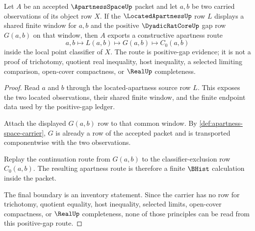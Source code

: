 \begin{theorem}
\label{thm:apartness-space-located-positive-gap}
Let $A$ be an accepted $\ApartnessSpaceUp$ packet and let $a,b$ be two carried
observations of its object row $X$. If the $\LocatedApartnessUp$ row $L$
displays a shared finite window for $a,b$ and the positive $\DyadicRatCoreUp$
gap row $G(a,b)$ on that window, then $A$ exports a constructive apartness
route
$$
a,b\longmapsto L(a,b)\longmapsto G(a,b)\longmapsto C_0(a,b)
$$
inside the local point classifier of $X$. The route is positive-gap evidence;
it is not a proof of trichotomy, quotient real inequality, host inequality, a
selected limiting comparison, open-cover compactness, or $\RealUp$
completeness.
\end{theorem}
\begin{proof}
Read $a$ and $b$ through the located-apartness source row $L$. This exposes the
two located observations, their shared finite window, and the finite endpoint
data used by the positive-gap ledger.

Attach the displayed $G(a,b)$ row to that common window. By
\autoref{def:apartness-space-carrier}, $G$ is already a row of the accepted
packet and is transported componentwise with the two observations.

Replay the continuation route from $G(a,b)$ to the classifier-exclusion row
$C_0(a,b)$. The resulting apartness route is therefore a finite $\BHist$
calculation inside the packet.

The final boundary is an inventory statement. Since the carrier has no row for
trichotomy, quotient equality, host inequality, selected limits, open-cover
compactness, or $\RealUp$ completeness, none of those principles can be read
from this positive-gap route.
\end{proof}


